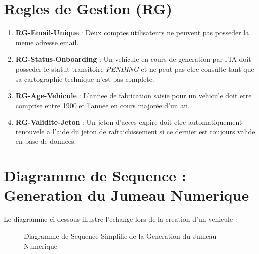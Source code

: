 \documentclass[11pt,a4paper]{report}
\begin{document}
\section{Regles de Gestion (RG)}
\begin{enumerate}[label=\textbf{RG-\arabic*}]
    \item \textbf{RG-Email-Unique} : Deux comptes utilisateurs ne peuvent pas posseder la meme adresse email.
    \item \textbf{RG-Status-Onboarding} : Un vehicule en cours de generation par l'IA doit posseder le statut transitoire \textit{PENDING} et ne peut pas etre consulte tant que sa cartographie technique n'est pas complete.
    \item \textbf{RG-Age-Vehicule} : L'annee de fabrication saisie pour un vehicule doit etre comprise entre 1900 et l'annee en cours majorée d'un an.
    \item \textbf{RG-Validite-Jeton} : Un jeton d'acces expire doit etre automatiquement renouvele a l'aide du jeton de rafraichissement si ce dernier est toujours valide en base de donnees.
\end{enumerate}

\section{Diagramme de Sequence : Generation du Jumeau Numerique}
Le diagramme ci-dessous illustre l'echange lors de la creation d'un vehicule :

\begin{figure}[h!]
\centering
{}
\caption{Diagramme de Sequence Simplifie de la Generation du Jumeau Numerique}
\label{fig:sequence}
\end{figure}
\end{document}
